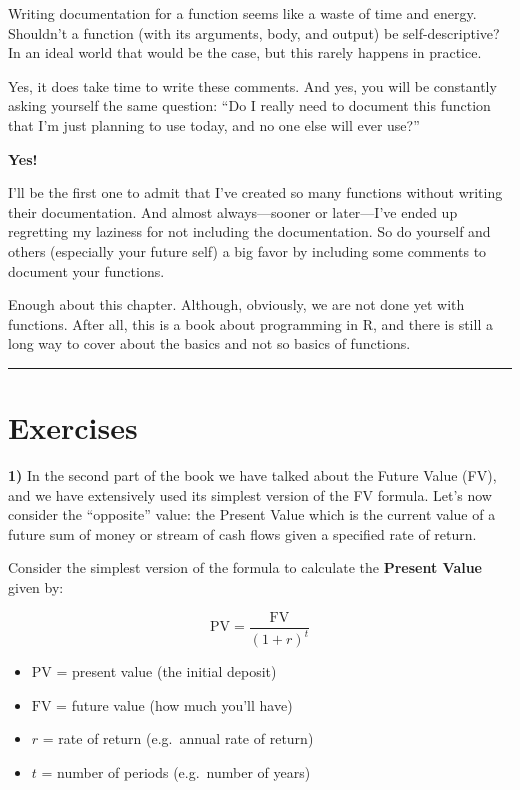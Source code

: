 \documentclass[
]{book}
\begin{document}
Writing documentation for a function seems like a waste of time and energy.
Shouldn't a function (with its arguments, body, and output) be
self-descriptive? In an ideal world that would be the case, but this rarely
happens in practice.

Yes, it does take time to write these comments. And yes, you will be constantly
asking yourself the same question: ``Do I really need to document this function
that I'm just planning to use today, and no one else will ever use?''

\textbf{Yes!}

I'll be the first one to admit that I've created so many functions without
writing their documentation. And almost always---sooner or later---I've ended
up regretting my laziness for not including the documentation.
So do yourself and others (especially your future self) a big favor by
including some comments to document your functions.

Enough about this chapter. Although, obviously, we are not done yet with
functions. After all, this is a book about programming in R, and there is still
a long way to cover about the basics and not so basics of functions.

\begin{center}\rule{0.5\linewidth}{0.5pt}\end{center}

\hypertarget{exercises-7}{%
\section{Exercises}\label{exercises-7}}

\textbf{1)} In the second part of the book we have talked about the Future Value (FV),
and we have extensively used its simplest version of the FV formula. Let's now
consider the ``opposite'' value: the Present Value which is the current value of a
future sum of money or stream of cash flows given a specified rate of return.

Consider the simplest version of the formula to calculate the
\textbf{Present Value} given by:

\[
\text{PV} = \frac{\text{FV}}{(1 + r)^t}
\]

\begin{itemize}
\item
  \(\text{PV}\) = present value (the initial deposit)
\item
  \(\text{FV}\) = future value (how much you'll have)
\item
  \(r\) = rate of return (e.g.~annual rate of return)
\item
  \(t\) = number of periods (e.g.~number of years)
\end{itemize}
\end{document}
